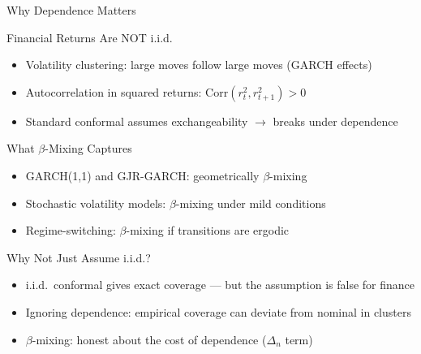 \documentclass[9pt, aspectratio=169, t]{beamer}
\begin{document}
\begin{frame}{Why Dependence Matters}
	\vspace{-0.3cm}
	{\footnotesize
	\begin{alertblock}{Financial Returns Are NOT i.i.d.}
		\begin{itemize}\setlength{\itemsep}{1pt}
			\item Volatility clustering: large moves follow large moves (GARCH effects)
			\item Autocorrelation in squared returns: $\mathrm{Corr}(r_t^2, r_{t+1}^2) > 0$
			\item Standard conformal assumes exchangeability $\to$ breaks under dependence
		\end{itemize}
	\end{alertblock}
	\vspace{0mm}
	\begin{block}{What $\beta$-Mixing Captures}
		\begin{itemize}\setlength{\itemsep}{1pt}
			\item GARCH(1,1) and GJR-GARCH: geometrically $\beta$-mixing
			\item Stochastic volatility models: $\beta$-mixing under mild conditions
			\item Regime-switching: $\beta$-mixing if transitions are ergodic
		\end{itemize}
	\end{block}
	\vspace{0mm}
	\begin{alertblock}{Why Not Just Assume i.i.d.?}
		\begin{itemize}\setlength{\itemsep}{1pt}
			\item i.i.d.\ conformal gives exact coverage --- but the assumption is false for finance
			\item Ignoring dependence: empirical coverage can deviate from nominal in clusters
			\item $\beta$-mixing: honest about the cost of dependence ($\Delta_n$ term)
		\end{itemize}
	\end{alertblock}
	}
\end{frame}
\end{document}
